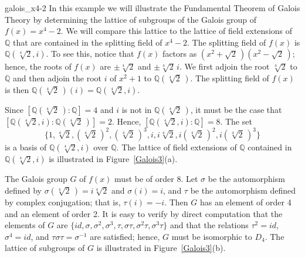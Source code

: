 \begin{example}{galois_x4-2}
In this example we will illustrate the Fundamental Theorem of Galois
Theory by determining the lattice of subgroups of the Galois group of
$f(x) = x^4 - 2$. We will compare this lattice to the lattice of field
extensions of ${\mathbb Q}$ that are contained in the splitting field of
$x^4-2$. The splitting field of $f(x)$ is ${\mathbb Q}( \sqrt[4]{2}, i
)$. To see this, notice that $f(x)$ factors as $(x^2 +
\sqrt{2}\, )(x^2 - \sqrt{2}\, )$; hence, the roots of $f(x)$ are $\pm
\sqrt[4]{2}$ and $\pm \sqrt[4]{2}\, i$. We first adjoin the root
$\sqrt[4]{2}$ to ${\mathbb Q}$ and then adjoin the root $i$ of $x^2 + 1$
to ${\mathbb Q}(\sqrt[4]{2}\, )$. The splitting field of $f(x)$ is then
${\mathbb Q}(\sqrt[4]{2}\, )(i) = {\mathbb Q}( \sqrt[4]{2}, i )$. 
 
 
Since $[ {\mathbb Q}( \sqrt[4]{2}\, ) : {\mathbb Q}] = 4$ and $i$ is not in
${\mathbb Q}( \sqrt[4]{2}\, )$, it must be the case that $[ {\mathbb Q}(
\sqrt[4]{2}, i ): {\mathbb Q}(\sqrt[4]{2}\, )] = 2$. Hence, $[ {\mathbb Q}(
\sqrt[4]{2}, i ):{\mathbb Q}] = 8$. The set
\[
\{ 1, \sqrt[4]{2}, (\sqrt[4]{2}\, )^2, (\sqrt[4]{2}\, )^3, i, i
\sqrt[4]{2}, i (\sqrt[4]{2}\, )^2, i(\sqrt[4]{2}\, )^3 \}
\]
is a basis of ${\mathbb Q}( \sqrt[4]{2}, i )$ over ${\mathbb Q}$. The
lattice of field extensions of ${\mathbb Q}$ contained in ${\mathbb Q}(
\sqrt[4]{2}, i)$ is illustrated in Figure~\ref{Galois3}(a).
 
The Galois group $G$ of $f(x)$ must be of order 8. Let $\sigma$ be the
automorphism defined by $\sigma( \sqrt[4]{2}\, ) = i \sqrt[4]{2}$ and
$\sigma( i ) = i$, and $\tau$ be the automorphism defined by complex
conjugation; that is, $\tau(i ) = -i$. Then $G$ has an element of
order 4 and an element of order 2. It is easy to verify by direct
computation that the elements of $G$ are $\{ id, \sigma, \sigma^2, 
\sigma^3, \tau, \sigma \tau, \sigma^2 \tau, \sigma^3 \tau \}$ and that
the relations $\tau^2 = id$, $\sigma^4 = id$, and $\tau \sigma \tau =
\sigma^{-1}$ are satisfied; hence, $G$ must be isomorphic to $D_4$.
The lattice of subgroups of $G$ is illustrated in Figure~\ref{Galois3}(b).
\end{example}
 

